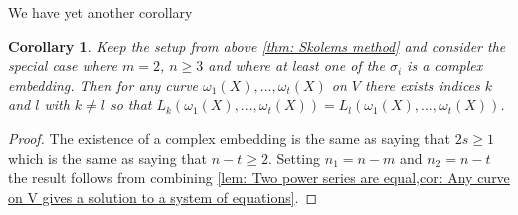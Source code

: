 \documentclass{article}
\newtheorem{corollary}{Corollary}[section]
\begin{document}
We have yet another corollary
\begin{corollary}\label{cor: Result to prove thues theorem}
    Keep the setup from above \cref{thm: Skolems method} and consider the special case where $m = 2$, $n \geq 3$ and where at least one of the $\sigma_i$ is a complex embedding. Then for any curve $\omega_1(X), ..., \omega_t(X)$ on $V$ there exists indices $k$ and $l$ with $k \neq l$ so that $L_k(\omega_1(X), ..., \omega_t(X)) = L_l(\omega_1(X), ..., \omega_t(X))$.
\end{corollary}
\begin{proof}
    The existence of a complex embedding is the same as saying that $2s \geq 1$ which is the same as saying that $n - t \geq 2$. Setting $n_1 = n-m$ and $n_2 = n-t$ the result follows from combining \cref{lem: Two power series are equal,cor: Any curve on V gives a solution to a system of equations}.
\end{proof}


\end{document}
